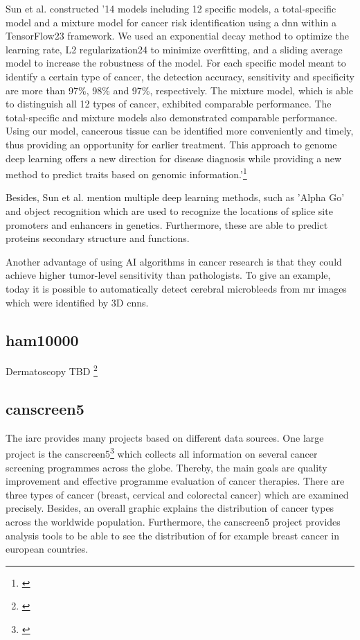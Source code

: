 Sun et al. constructed '14 models including 12 specific models, a total-specific model and a mixture model for cancer risk identification using a \ac{dnn} within a TensorFlow23 framework. We used an exponential decay method to optimize the learning rate, L2 regularization24 to minimize overfitting, and a sliding average model to increase the robustness of the model. For each specific model meant to identify a certain type of cancer, the detection accuracy, sensitivity and specificity are more than 97\%, 98\% and 97\%, respectively. The mixture model, which is able to distinguish all 12 types of cancer, exhibited comparable performance. The total-specific and mixture models also demonstrated comparable performance. Using our model, cancerous tissue can be identified more conveniently and timely, thus providing an opportunity for earlier treatment. This approach to genome deep learning offers a new direction for disease diagnosis while providing a new method to predict traits based on genomic information.'\footnote{\cite{sun_identification}}

Besides, Sun et al. mention multiple deep learning methods, such as 'Alpha Go' and object recognition which are used to recognize the locations of splice site promoters and enhancers in genetics. Furthermore, these are able to predict proteins secondary structure and functions.

Another advantage of using AI algorithms in cancer research is that they could achieve higher tumor-level sensitivity than pathologists. To give an example, today it is possible to automatically detect cerebral microbleeds from \ac{mr} images which were identified by 3D \ac{cnn}s.

\subsection{\ac{ham10000}}
Dermatoscopy TBD 
\footnote{\cite{ham10000}}

\subsection{\ac{canscreen5}}

The \ac{iarc} provides many projects based on different data sources. One large project is the \ac{canscreen5}\footnote{\cite{iarc_canscreen5_project}} which collects all information on several cancer screening programmes across the globe. Thereby, the main goals are quality improvement and effective programme evaluation of cancer therapies. There are three types of cancer (breast, cervical and colorectal cancer) which are examined precisely. Besides, an overall graphic explains the distribution of cancer types across the worldwide population. Furthermore, the \ac{canscreen5} project provides analysis tools to be able to see the distribution of for example breast cancer in european countries.  

